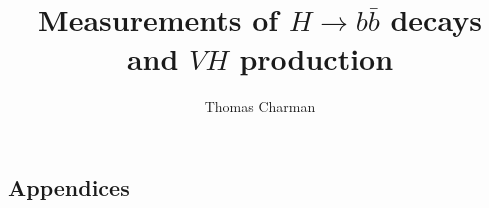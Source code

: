 \documentclass[a4paper,12pt, oneside]{memoir}
\begin{document}
\title{Measurements of $H \rightarrow b\bar{b}$ decays and $VH$ production}

\author{Thomas Charman}
\submitdate{\today}

\doublespacing
\maketitle

%
%
%
\setcounter{tocdepth}{3}
\tableofcontents*















\appendix



\clearpage
\begin{appendices}
\chapter{Appendices}
% 
% 
% 


\end{appendices}
\end{document}
